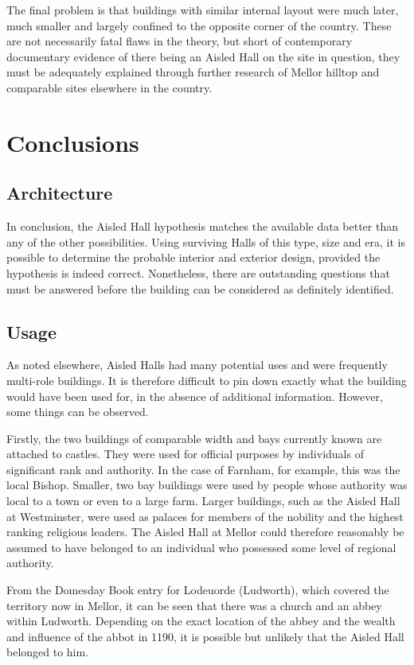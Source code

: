 \documentclass[letterpaper,11pt,titlepage]{article}
\begin{document}
{The final problem is that buildings with similar internal layout were much later, much smaller and largely confined to the opposite corner of the country.
These are not necessarily fatal flaws in the theory, but short of contemporary documentary evidence of there being an Aisled Hall on the site in question, they must be adequately explained through further research of Mellor hilltop and comparable sites elsewhere in the country. 

\section{Conclusions}

\subsection{Architecture}
In conclusion, the Aisled Hall hypothesis matches the available data better than any of the other possibilities. Using surviving Halls of this type, size and era, it is possible to determine the probable interior and exterior design, provided the hypothesis is indeed correct. Nonetheless, there are outstanding questions that must be answered before the building can be considered as definitely identified.

\subsection{Usage}
As noted elsewhere, Aisled Halls had many potential uses and were frequently multi-role buildings. It is therefore difficult to pin down exactly what the building would have been used for, in the absence of additional information. However, some things can be observed.

Firstly, the two buildings of comparable width and bays currently known are attached to castles. They were used for official purposes by individuals of significant rank and authority. In the case of Farnham, for example, this was the local Bishop. Smaller, two bay buildings were used by people whose authority was local to a town or even to a large farm. Larger buildings, such as the Aisled Hall at Westminster, were used as palaces for members of the nobility and the highest ranking religious leaders. The Aisled Hall at Mellor could therefore reasonably be assumed to have belonged to an individual who possessed some level of regional authority.

From the Domesday Book entry for Lodeuorde (Ludworth), which covered the territory now in Mellor, it can be seen that there was a church and an abbey within Ludworth. Depending on the exact location of the abbey and the wealth and influence of the abbot in 1190, it is possible but unlikely that the Aisled Hall belonged to him.

}
\end{document}
